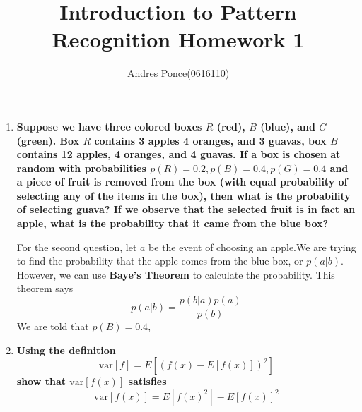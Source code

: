 \documentclass{article}
\title{Introduction to Pattern Recognition Homework 1}
\author{Andres Ponce(0616110)}
\begin{document}
\maketitle

\begin{enumerate}
	\item 
		\textbf{Suppose we have three colored boxes $R$ (red), $B$ (blue), 
		and $G$ (green). Box $R$ contains 3 apples 4 oranges, and 3
		guavas, box $B$ contains 12 apples, 4 oranges, and 4 guavas. If
		a box is chosen at random with probabilities $p(R)=0.2,p(B)=0.4,p(G)=0.4$
		and a piece of fruit is removed from the box (with equal probability of selecting
		any of the items in the box), then what is the probability of selecting guava? If
		we observe that the selected fruit is in fact an apple, what is the probability
		that it came from the blue box?}

		For the second question, let $a$ be the event of choosing an apple.We are trying to find the 
		probability that the apple comes from the blue box, or $p(a|b)$. However, we can
		use \textbf{Baye's Theorem} to calculate the probability. This theorem says 
		\[p(a|b) = \frac{p(b|a)p(a)}{p(b)} \]
		We are told that $p(B) = 0.4$,
		
	\item
		\textbf{Using the definition} \[\textrm{var}[f] = E[(f(x) - E[f(x)])^{2}] \]
		\textbf{show that $\textrm{var}[f(x)]$ satisfies}
		\[\textrm{var}[f(x)] = E[f(x)^{2}] - E[f(x)]^{2}\]

\end{enumerate}
\end{document}
